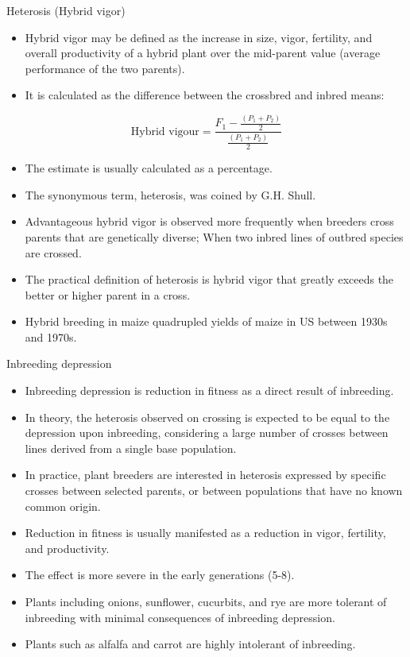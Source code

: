 \documentclass[11pt,dvipsnames,ignorenonframetext,aspectratio=169]{beamer}
\providecommand{\tightlist}{%
  \setlength{\itemsep}{0pt}\setlength{\parskip}{0pt}}
\begin{document}
\begin{frame}{Heterosis (Hybrid vigor)}
\protect\hypertarget{heterosis-hybrid-vigor}{}

\begin{itemize}
\tightlist
\item
  Hybrid vigor may be defined as the increase in size, vigor, fertility,
  and overall productivity of a hybrid plant over the mid-parent value
  (average performance of the two parents).
\item
  It is calculated as the difference between the crossbred and inbred
  means:
\end{itemize}

\[\text{Hybrid vigour} = \frac{F_1-\frac{(P_1+P_2)}{2}}{\frac{(P_1+P_2)}{2}}\]

\begin{itemize}
\tightlist
\item
  The estimate is usually calculated as a percentage.
\item
  The synonymous term, heterosis, was coined by G.H. Shull.
\item
  Advantageous hybrid vigor is observed more frequently when breeders
  cross parents that are genetically diverse; When two inbred lines of
  outbred species are crossed.
\item
  The practical definition of heterosis is hybrid vigor that greatly
  exceeds the better or higher parent in a cross.
\item
  Hybrid breeding in maize quadrupled yields of maize in US between
  1930s and 1970s.
\end{itemize}

\end{frame}

\begin{frame}{Inbreeding depression}
\protect\hypertarget{inbreeding-depression}{}

\begin{itemize}
\tightlist
\item
  Inbreeding depression is reduction in fitness as a direct result of
  inbreeding.
\item
  In theory, the heterosis observed on crossing is expected to be equal
  to the depression upon inbreeding, considering a large number of
  crosses between lines derived from a single base population.
\item
  In practice, plant breeders are interested in heterosis expressed by
  specific crosses between selected parents, or between populations that
  have no known common origin.
\item
  Reduction in fitness is usually manifested as a reduction in vigor,
  fertility, and productivity.
\item
  The effect is more severe in the early generations (5-8).
\item
  Plants including onions, sunflower, cucurbits, and rye are more
  tolerant of inbreeding with minimal consequences of inbreeding
  depression.
\item
  Plants such as alfalfa and carrot are highly intolerant of inbreeding.
\end{itemize}

\end{frame}
\end{document}
